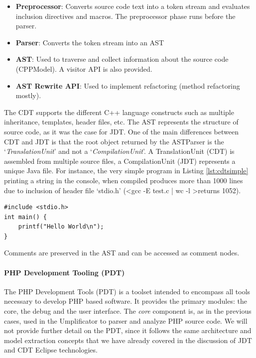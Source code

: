 \begin{itemize}
\item \textbf{Preprocessor}: Converts source code text into a token stream and evaluates inclusion directives and macros. The preprocessor phase runs before the parser. 
\item \textbf{Parser}: Converts the token stream into an AST
\item \textbf{AST}: Used to traverse and collect information about the source code (CPPModel). A visitor API is also provided. 
\item \textbf{AST Rewrite API}: Used to implement refactoring (method refactoring mostly).
\end{itemize}

The CDT supports the different C++ language constructs such as multiple inheritance, templates, header files, etc.
The AST represents the structure of source code, as it was the case for JDT.  One of the main differences between CDT and JDT is that the root object returned by the ASTParser is the `\textit{TranslationUnit}' and not a `\textit{CompilationUnit}'. 
A TranslationUnit (CDT) is assembled from multiple source files, a CompilationUnit (JDT) represents a unique Java file.
For instance, the very simple program in Listing \ref{lst:cdtsimple} printing a string in the console, when compiled produces more than 1000 lines due to inclusion of header file `stdio.h' (\textless gcc -E test.c | wc -l \textgreater returns 1052).

\begin{lstlisting}[style=java, caption=Simple example in C++ - test.c , label=lst:cdtsimple]
#include <stdio.h>
int main() {
	printf("Hello World\n");
}
\end{lstlisting}

Comments are preserved in the AST and can be accessed as comment nodes.

\paragraph*{PHP Development Tooling (PDT)}

The PHP Development Tools (PDT) is a toolset intended to encompass all tools necessary to develop PHP based software. 
It provides the primary modules: the core, the debug and the user interface. The \textit{core} component is, as in the previous cases, used in the Umplificator to parser and analyze PHP source code.
We will not provide further detail on the PDT, since it follows the same architecture and model extraction concepts that we have already covered in the discussion of JDT and CDT Eclipse technologies.

